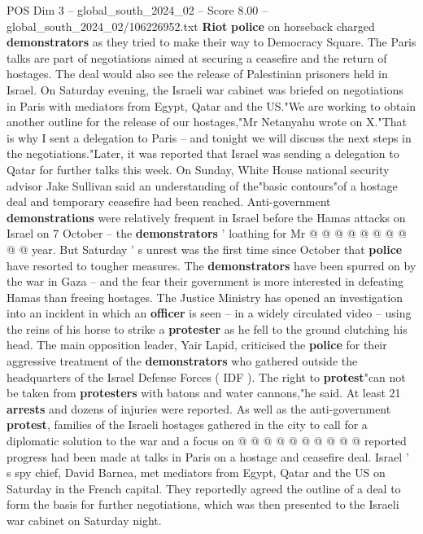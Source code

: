 \begin{textsample}{POS Dim 3 – global\_south\_2024\_02 – Score 8.00 – global\_south\_2024\_02/106226952.txt}  \label{ex:f3_pos_370}
\textbf{Riot} \textbf{police} on horseback charged \textbf{demonstrators} as they tried to make their way to Democracy Square.
The Paris talks are part of negotiations aimed at securing a ceasefire and the return of hostages.
The deal would also see the release of Palestinian prisoners held in Israel.
On Saturday evening, the Israeli war cabinet was briefed on negotiations in Paris with mediators from Egypt, Qatar and the US."We are working to obtain another outline for the release of our hostages,"Mr Netanyahu wrote on X."That is why I sent a delegation to Paris -- and tonight we will discuss the next steps in the negotiations."Later, it was reported that Israel was sending a delegation to Qatar for further talks this week.
On Sunday, White House national security advisor Jake Sullivan said an understanding of the"basic contours"of a hostage deal and temporary ceasefire had been reached.
Anti-government \textbf{demonstrations} were relatively frequent in Israel before the Hamas attacks on Israel on 7 October -- the \textbf{demonstrators} ' loathing for Mr @ @ @ @ @ @ @ @ @ @ year.
But Saturday ' s unrest was the first time since October that \textbf{police} have resorted to tougher measures.
The \textbf{demonstrators} have been spurred on by the war in Gaza -- and the fear their government is more interested in defeating Hamas than freeing hostages.
The Justice Ministry has opened an investigation into an incident in which an \textbf{officer} is seen -- in a widely circulated video -- using the reins of his horse to strike a \textbf{protester} as he fell to the ground clutching his head.
The main opposition leader, Yair Lapid, criticised the \textbf{police} for their aggressive treatment of the \textbf{demonstrators} who gathered outside the headquarters of the Israel Defense Forces ( IDF ).
The right to \textbf{protest}"can not be taken from \textbf{protesters} with batons and water cannons,"he said.
At least 21 \textbf{arrests} and dozens of injuries were reported.
As well as the anti-government \textbf{protest}, families of the Israeli hostages gathered in the city to call for a diplomatic solution to the war and a focus on @ @ @ @ @ @ @ @ @ @ reported progress had been made at talks in Paris on a hostage and ceasefire deal.
Israel ' s spy chief, David Barnea, met mediators from Egypt, Qatar and the US on Saturday in the French capital.
They reportedly agreed the outline of a deal to form the basis for further negotiations, which was then presented to the Israeli war cabinet on Saturday night.

\end{textsample}
